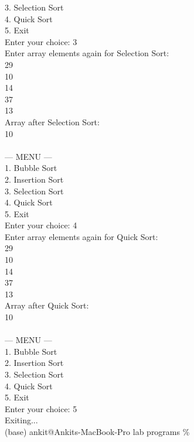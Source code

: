 \documentclass[12pt,a4paper]{article}
\begin{document}
\begin{tcolorbox}[terminalstyle, title=Sample Output]
{3. Selection Sort\\
4. Quick Sort\\
5. Exit\\
Enter your choice: 3\\
Enter array elements again for Selection Sort:\\
29\\
10\\
14\\
37\\
13\\
Array after Selection Sort:\\
10    \\
\\
--- MENU ---\\
1. Bubble Sort\\
2. Insertion Sort\\
3. Selection Sort\\
4. Quick Sort\\
5. Exit\\
Enter your choice: 4\\
Enter array elements again for Quick Sort:\\
29\\
10\\
14\\
37\\
13\\
Array after Quick Sort:\\
10    \\
\\
--- MENU ---\\
1. Bubble Sort\\
2. Insertion Sort\\
3. Selection Sort\\
4. Quick Sort\\
5. Exit\\
Enter your choice: 5\\
Exiting...\\
(base) ankit@Ankits-MacBook-Pro lab programs \%
}
\end{tcolorbox}

\newpage
\newpage
\newpage
\newpage
\newpage
\newpage
\newpage
\newpage
\newpage
\newpage
\newpage
\newpage
\newpage
\newpage
\newpage
\newpage
\end{document}
